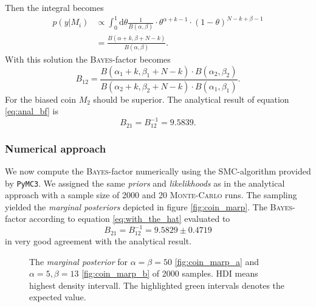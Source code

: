 \documentclass[%
 reprint,
 amsmath,amssymb,
 aps,
]{revtex4-1}
\begin{document}
Then the integral becomes 
\begin{align*}
	p(y|M_i)&\propto \int_{0}^{1} \text{d}\theta \frac{1}{B(\alpha,\beta)} \cdot \theta^{\alpha+k-1}\cdot (1-\theta)^{N-k+\beta-1}\\
	&=\frac{B(\alpha+k,\beta+N-k)}{B(\alpha, \beta)}.
\end{align*}
With this solution the \textsc{Bayes}-factor becomes
\begin{equation}\label{eq:anal_bf}
	B_{12}=\frac{B(\alpha_1+k,\beta_1+N-k)\cdot B(\alpha_2,\beta_2)}{B(\alpha_2+k,\beta_2+N-k)\cdot B(\alpha_1,\beta_1)}.
\end{equation}
For the biased coin $M_2$ should be superior. The analytical result of equation \eqref{eq:anal_bf} is $$B_{21}=B_{12}^{-1}=9.5839.$$

\subsubsection{\textbf{Numerical approach}}
\noindent We now compute the \textsc{Bayes}-factor numerically using the SMC-algorithm provided by \texttt{PyMC3}. We assigned the same \emph{priors} and \emph{likelikhoods} as in the analytical approach with a sample size of 2000 and 20 \textsc{Monte-Carlo} runs. The sampling yielded the \emph{marginal posteriors} depicted in figure \eqref{fig:coin_marp}. 
The \textsc{Bayes}-factor according to equation \eqref{eq:with_the_hat} evaluated to
$$B_{21}=B_{12}^{-1}=9.5829\pm0.4719$$
in very good agreement with the analytical result.
\begin{figure}
	\begin{subfigure}{\linewidth}
		\subcaption{}\label{fig:coin_marp_a}
	\end{subfigure}
	\begin{subfigure}{\linewidth}
		\subcaption{}\label{fig:coin_marp_b}
	\end{subfigure}
	\caption{The \emph{marginal posterior} for $\alpha=\beta=50$ \eqref{fig:coin_marp_a} and $\alpha=5, \beta=13$ \eqref{fig:coin_marp_b} of 2000 samples. HDI means highest density intervall. The highlighted green intervals denotes the expected value.}\label{fig:coin_marp}
\end{figure}
\end{document}
